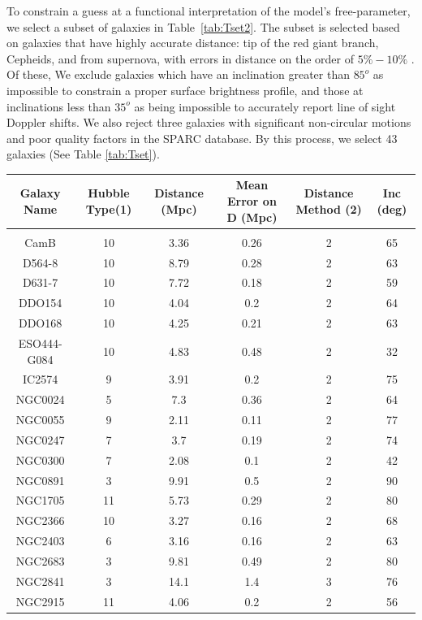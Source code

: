 \documentclass[reprint,%
 amsmath,amssymb,
 aps,
]{revtex4-1}
\begin{document}
To constrain a guess at a functional interpretation of the model's free-parameter, we select a
  subset of galaxies in Table~\ref{tab:Tset2}. The  subset is selected based on
   galaxies that have highly accurate distance:   tip of the red giant branch,  Cepheids, and  from supernova, with errors in distance on the order of $5\% - 10\%$ \cite{2016Lelli}. Of these, We   exclude galaxies  which have an inclination greater than $85^o$ as impossible to constrain a proper surface brightness profile, and those at inclinations less than $35^o$ as being impossible to accurately report line of sight Doppler shifts.  We also reject  three galaxies with significant non-circular motions and poor quality factors in the SPARC database.  
  By this process, we select 43 galaxies (See Table \ref{tab:Tset}). 
  
  
  \begin{table}[]
      \centering
      \begin{tabular}{|c|c|c|c|c|c|}
      \hline \hline
Galaxy Name & Hubble Type(1)& 	Distance (Mpc)&Mean Error on D (Mpc)& 	Distance Method (2)& 	Inc (deg)\\
    \hline \hline\\
CamB&   	10&    3.36&  	0.26&   2&  65\\
D564-8& 	10& 	8.79& 	0.28& 	2& 	63\\
D631-7& 	10& 	7.72& 	0.18& 	2& 	59\\
DDO154& 	10& 	4.04& 	0.2& 	2& 	64\\
DDO168& 	10& 	4.25& 	0.21& 	2& 	63\\
ESO444-G084& 10& 	4.83& 	0.48& 	2& 	32\\
IC2574& 	9& 	3.91& 	0.2&    	2& 	75\\
NGC0024& 	5& 	7.3& 	0.36&   	2& 	64\\
NGC0055& 	9& 	2.11& 	0.11&   	2& 	77\\
NGC0247& 	7& 	3.7& 	0.19&   	2& 	74\\
NGC0300& 	7& 	2.08& 	0.1&    	2& 	42\\
NGC0891& 	3& 	9.91& 	0.5&    	2& 	90\\
NGC1705& 	11& 	5.73& 	0.29& 	2& 	80\\
NGC2366& 	10& 	3.27& 	0.16& 	2& 	68\\
NGC2403& 	6& 	3.16& 	0.16&   	2& 	63\\
NGC2683& 	3& 	9.81& 	0.49&   	2& 	80\\
NGC2841& 	3& 	14.1& 	1.4&    	3& 	76\\
NGC2915& 	11& 	4.06& 	0.2& 	2& 	56\\

\end{tabular}
\end{table}
\end{document}
